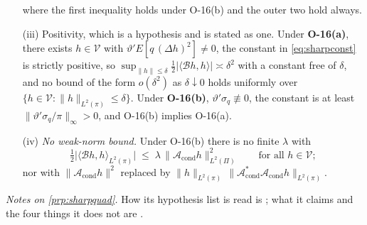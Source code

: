 \begin{proposition}
\begin{enumerate}
\begin{equation}
\end{equation}
where the first inequality holds under O-16\textup{(b)} and the outer two hold always.
\item[(iii)] Positivity, which is a hypothesis and is stated as one. Under
\textbf{O-16\textup{(a)}}, there exists $h\in\mathcal V$ with $\vartheta'E[q\,(\Delta h)^{2}]\ne0$, 
the constant in \eqref{eq:sharpconst} is strictly positive, so
$\sup_{\|h\|\le\delta}\tfrac12|\langle\mathcal Bh,h\rangle|\asymp\delta^{2}$ with a constant free of
$\delta$, and no bound of the form $o(\delta^{2})$ as $\delta\downarrow0$ holds uniformly over
$\{h\in\mathcal V:\|h\|_{L^{2}(\pi)}\le\delta\}$. Under \textbf{O-16\textup{(b)}}, 
$\vartheta'\sigma_q\not\equiv0$, the constant is at least $\|\vartheta'\sigma_q/\pi\|_\infty>0$, and
O-16\textup{(b)} implies O-16\textup{(a)}.
\item[(iv)] \emph{No weak-norm bound.} Under O-16\textup{(b)} there is no finite $\lambda$ with
\begin{equation}\label{eq:noweak}
\tfrac12\big|\big\langle\mathcal Bh,h\big\rangle_{L^{2}(\pi)}\big|
\;\le\;\lambda\,\big\|\mathcal A_{\mathrm{cond}}h\big\|^{2}_{L^{2}(\Pi)}
\qquad\text{for all }h\in\mathcal V ;
\end{equation}
nor with $\|\mathcal A_{\mathrm{cond}}h\|^{2}$ replaced by
$\|h\|_{L^{2}(\pi)}\,\|\mathcal A^\ast_{\mathrm{cond}}\mathcal A_{\mathrm{cond}}h\|_{L^{2}(\pi)}$.
\end{enumerate}
\end{proposition}

\noindent\emph{Notes on \cref{prp:sharpquad}.} How its hypothesis list is read is
; what it claims and the four things it does not are
.

